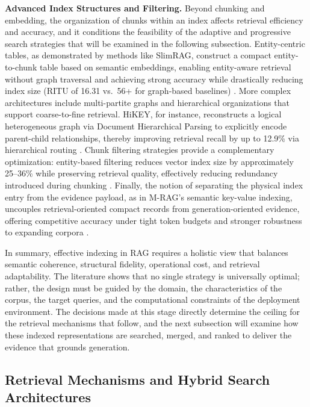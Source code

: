 \documentclass[11pt]{article}
\begin{document}
\textbf{Advanced Index Structures and Filtering.} Beyond chunking and embedding, the organization of chunks within an index affects retrieval efficiency and accuracy, and it conditions the feasibility of the adaptive and progressive search strategies that will be examined in the following subsection. Entity-centric tables, as demonstrated by methods like SlimRAG, construct a compact entity-to-chunk table based on semantic embeddings, enabling entity-aware retrieval without graph traversal and achieving strong accuracy while drastically reducing index size (RITU of 16.31 vs.~56+ for graph-based baselines) \cite{ref95}. More complex architectures include multi-partite graphs and hierarchical organizations that support coarse-to-fine retrieval. HiKEY, for instance, reconstructs a logical heterogeneous graph via Document Hierarchical Parsing to explicitly encode parent-child relationships, thereby improving retrieval recall by up to 12.9\% via hierarchical routing \cite{ref96}. Chunk filtering strategies provide a complementary optimization: entity-based filtering reduces vector index size by approximately 25--36\% while preserving retrieval quality, effectively reducing redundancy introduced during chunking \cite{ref97}. Finally, the notion of separating the physical index entry from the evidence payload, as in M-RAG's semantic key-value indexing, uncouples retrieval-oriented compact records from generation-oriented evidence, offering competitive accuracy under tight token budgets and stronger robustness to expanding corpora \cite{ref98}.

In summary, effective indexing in RAG requires a holistic view that balances semantic coherence, structural fidelity, operational cost, and retrieval adaptability. The literature shows that no single strategy is universally optimal; rather, the design must be guided by the domain, the characteristics of the corpus, the target queries, and the computational constraints of the deployment environment. The decisions made at this stage directly determine the ceiling for the retrieval mechanisms that follow, and the next subsection will examine how these indexed representations are searched, merged, and ranked to deliver the evidence that grounds generation.

\subsection{Retrieval Mechanisms and Hybrid Search Architectures}
\end{document}
